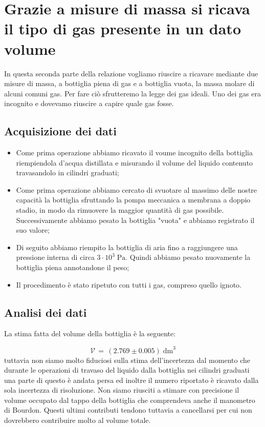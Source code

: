 \section{Grazie a misure di massa si ricava il tipo di gas presente in un dato volume}   

In questa seconda parte della relazione vogliamo riuscire a ricavare mediante due misure di massa,
a bottiglia piena di gas e a bottiglia vuota, la massa molare di alcuni comuni gas. Per fare ciò
sfrutteremo la legge dei gas ideali. Uno dei gas era incognito e dovevamo riuscire a capire quale gas fosse.

\subsection{Acquisizione dei dati}

\begin{itemize}
	\item{Come prima operazione abbiamo ricavato il voume incognito della bottiglia riempiendola d'acqua distillata e misurando il volume del liquido contenuto travasandolo in cilindri graduati;}
	\item{Come prima operazione abbiamo cercato di svuotare al massimo delle nostre capacità la bottiglia sfruttando la pompa meccanica a membrana a doppio stadio, in modo da rimuovere la maggior quantità di gas possibile. Successivamente abbiamo pesato la bottiglia "vuota" e abbiamo registrato il suo valore;}
	\item{Di seguito abbiamo riempito la bottiglia di aria fino a raggiungere una pressione interna di circa $3 \cdot 10^3 \; \si{\pascal}$. Quindi abbiamo pesato nuovamente la bottiglia piena annotandone il peso;}
	\item{Il procedimento è stato ripetuto con tutti i gas, compreso quello ignoto.}
\end{itemize}

\subsection{Analisi dei dati}

La stima fatta del volume della bottiglia è la seguente:

\begin{equation}
	\mathcal{V} \, = \, (2.769 \pm 0.005) \; \si{\deci\meter}^3  
\end{equation}
%
tuttavia non siamo molto fiduciosi sulla stima dell'incertezza dal momento che durante le operazioni di
travaso del liquido dalla bottiglia nei cilindri graduati una parte di questo è andata persa ed inoltre
il numero riportato è ricavato dalla sola incertezza di risoluzione.
Non siamo riusciti a stimare con precisione il volume occupato dal tappo della bottiglia che
comprendeva anche il manometro di Bourdon. Questi ultimi contributi tendono tuttavia a cancellarsi
per cui non dovrebbero contribuire molto al volume totale.

